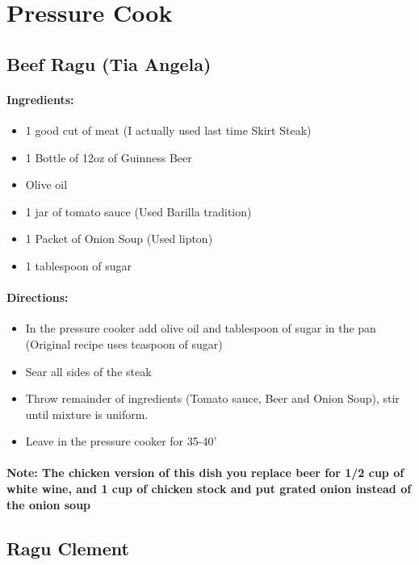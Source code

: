\documentclass{article}
\begin{document}
\section{Pressure Cook}

\subsection{Beef Ragu (Tia Angela)}

\paragraph{Ingredients:}

\begin{itemize}
	\item 1 good cut of meat (I actually used last time Skirt Steak)
	\item 1 Bottle of 12oz of Guinness Beer
	\item Olive oil
	\item 1 jar of tomato sauce (Used Barilla tradition)
	\item 1 Packet of Onion Soup (Used lipton)
	\item 1 tablespoon of sugar
\end{itemize}

\paragraph{Directions:}
\begin{itemize}
	\item In the pressure cooker add olive oil and tablespoon of sugar in the pan (Original recipe uses teaspoon of sugar)
	\item Sear all sides of the steak
	\item Throw remainder of ingredients (Tomato sauce, Beer and Onion Soup), stir until mixture is uniform.
	\item Leave in the pressure cooker for 35-40'
\end{itemize}

\paragraph{Note: The chicken version of this dish you replace beer for 1/2 cup of white wine, and 1 cup of chicken stock and put grated onion instead of the onion soup}

\subsection{Ragu Clement}
\end{document}
